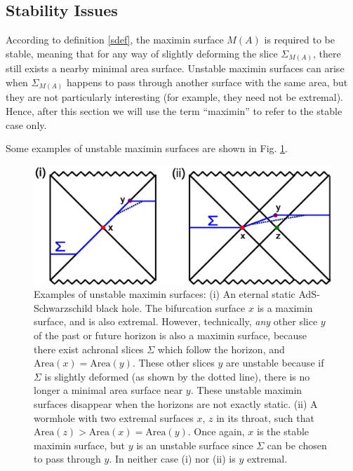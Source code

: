 \documentclass{article}
\begin{document}
\subsection{Stability Issues}\label{stable}

According to definition \ref{sdef}, the maximin surface $M(A)$ is required to be stable, meaning that for any way of slightly deforming the slice $\Sigma_{M(A)}$, there still exists a nearby minimal area surface.  Unstable maximin surfaces can arise when $\Sigma_{M(A)}$ happens to pass through another surface with the same area, but they are not particularly interesting (for example, they need not be extremal).  Hence, after this section we will use the term ``maximin'' to refer to the stable case only.

Some examples of unstable maximin surfaces are shown in Fig. \ref{unstable}.
\begin{figure}[hbt]
\centering
\includegraphics[width=.7\textwidth]{unstable.eps}
\caption{\footnotesize Examples of unstable maximin surfaces: (i) An eternal static AdS-Schwarzschild black hole.  The bifurcation surface $x$ is a maximin surface, and is also extremal.  However, technically, \emph{any} other slice $y$ of the past or future horizon is also a maximin surface, because there exist achronal slices $\Sigma$ which follow the horizon, and $\mathrm{Area}(x) = \mathrm{Area}(y)$.  These other slices $y$ are unstable because if $\Sigma$ is slightly deformed (as shown by the dotted line), there is no longer a minimal area surface near $y$.  These unstable maximin surfaces disappear when the horizons are not exactly static.  (ii) A wormhole with two extremal surfaces $x$, $z$ in its throat, such that $\mathrm{Area}(z) > \mathrm{Area}(x) = \mathrm{Area}(y)$.  Once again, $x$ is the stable maximin surface, but $y$ is an unstable surface since $\Sigma$ can be chosen to pass through $y$.  In neither case (i) nor (ii) is $y$ extremal.}\label{unstable}
\end{figure}
\end{document}
